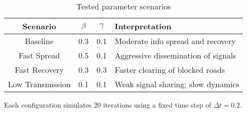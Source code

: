 \begin{table}[h]
\centering
\begin{tabular}{|c|c|c|l|}
\hline
\textbf{Scenario} & \( \beta \) & \( \gamma \) & \textbf{Interpretation} \\
\hline
Baseline & 0.3 & 0.1 & Moderate info spread and recovery \\
Fast Spread & 0.5 & 0.1 & Aggressive dissemination of signals \\
Fast Recovery & 0.3 & 0.3 & Faster clearing of blocked roads \\
Low Transmission & 0.1 & 0.1 & Weak signal sharing; slow dynamics \\
\hline
\end{tabular}
\caption{Tested parameter scenarios}
\end{table}

Each configuration simulates 20 iterations using a fixed time step of \( \Delta t = 0.2 \).
